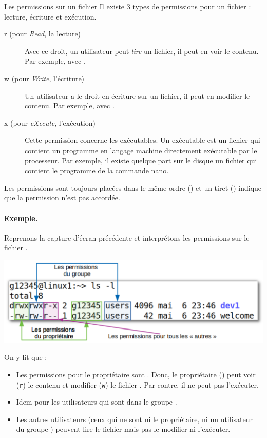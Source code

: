 \documentclass[a4paper,11pt]{style-esi/td}
\begin{document}
		\begin{theorie}{Les permissions sur un fichier}
			Il existe 3 types de permissions pour un fichier : 
			lecture, écriture et exécution.
			\begin{description}
			\item[r (pour \emph{Read}, la lecture)] 
				Avec ce droit, un utilisateur peut 
				\emph{lire} un fichier, il peut en voir le contenu. 
				Par exemple, avec .
			\item[w (pour \emph{Write}, l'écriture)]
				Un utilisateur a le droit en écriture sur un fichier, 
				il peut en modifier le contenu. 
				Par exemple, avec .
			\item[x (pour \emph{eXecute}, l'exécution)]
				Cette permission concerne les exécutables. 
				Un exécutable est un fichier qui contient 
				un programme en langage machine 
				directement exécutable par le processeur.
				Par exemple, il existe quelque part sur le disque 
				un fichier  
				qui contient le programme de la commande nano.
			\end{description}
		\end{theorie}

		Les permissions sont toujours placées dans le même ordre ()
		et un tiret (\samp{-}) indique que la permission n'est pas accordée.

		\paragraph{Exemple.}
		Reprenons la capture d'écran précédente et interprétons
		les permissions sur le fichier .
		\begin{center}
			\includegraphics[width=.8\textwidth]{image/categorie}
		\end{center}
		On y lit que :
		\begin{itemize}
		\item
			Les permissions pour le propriétaire sont .
			Donc, le propriétaire () 
			peut voir (\texttt{r}) le contenu 
			et modifier (\texttt{w}) le fichier .
			Par contre, il ne peut pas l'exécuter.
		\item 
			Idem pour les utilisateurs qui sont dans le groupe .
		\item 
			Les autres utilisateurs 
			(ceux qui ne sont ni le propriétaire, ni un utilisateur du groupe )
			peuvent lire le fichier mais pas le modifier ni l'exécuter.
		\end{itemize}
\end{document}
